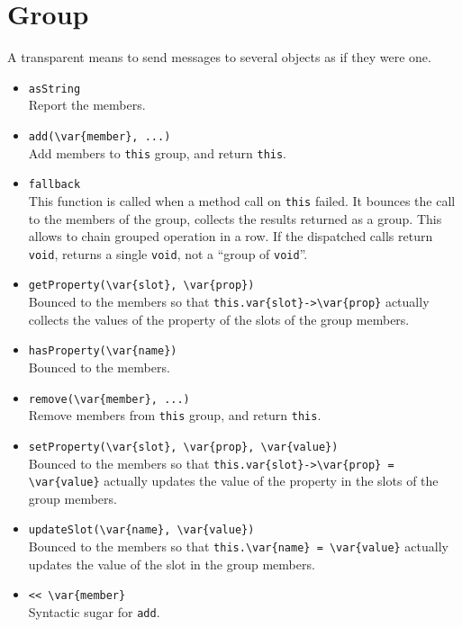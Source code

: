 \section{Group}
A transparent means to send messages to several objects as if they
were one.

\begin{itemize}
\item \lstinline|asString|\\
  Report the members.
\item \lstinline|add(\var{member}, ...)|\\
  Add members to \lstinline|this| group, and return \lstinline|this|.
\item \lstinline|fallback|\\
  This function is called when a method call on \lstinline|this|
  failed.  It bounces the call to the members of the group, collects
  the results returned as a group.  This allows to chain grouped
  operation in a row.  If the dispatched calls return
  \lstinline|void|, returns a single \lstinline|void|, not a ``group
  of \lstinline|void|''.
\item \lstinline|getProperty(\var{slot}, \var{prop})|\\
  Bounced to the members so that
  \lstinline|this.var{slot}->\var{prop}| actually collects the values
  of the property  of the slots  of the group
  members.
\item \lstinline|hasProperty(\var{name})|\\
  Bounced to the members.
\item \lstinline|remove(\var{member}, ...)|\\
  Remove members from \lstinline|this| group, and return
  \lstinline|this|.
\item \lstinline|setProperty(\var{slot}, \var{prop}, \var{value})|\\
  Bounced to the members so that
  \lstinline|this.var{slot}->\var{prop} = \var{value}|
  actually updates the value of the property 
  in the slots  of the group members.
\item \lstinline|updateSlot(\var{name}, \var{value})|\\
  Bounced to the members so that
  \lstinline|this.\var{name} = \var{value}|
  actually updates the value of the slot  in
  the group members.
\item \lstinline|<< \var{member}|\\
  Syntactic sugar for \lstinline|add|.
\end{itemize}

